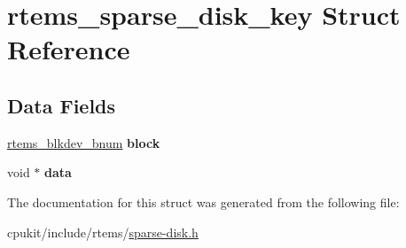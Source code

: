 \hypertarget{structrtems__sparse__disk__key}{}\section{rtems\+\_\+sparse\+\_\+disk\+\_\+key Struct Reference}
\label{structrtems__sparse__disk__key}
\subsection*{Data Fields}
\begin{DoxyCompactItemize}
\item 
\mbox{\label{structrtems__sparse__disk__key_a52bbfe32bc9ae068a461835745270183}} 
\mbox{\hyperlink{group__rtems__disk_ga5fbcfd40b657bff6c54d9e393fab3274}{rtems\+\_\+blkdev\+\_\+bnum}} {\bfseries block}
\item 
\mbox{\label{structrtems__sparse__disk__key_a7084dc44764396310883bb5858154a2d}} 
void $\ast$ {\bfseries data}
\end{DoxyCompactItemize}


The documentation for this struct was generated from the following file\+:\begin{DoxyCompactItemize}
\item 
cpukit/include/rtems/\mbox{\hyperlink{sparse-disk_8h}{sparse-\/disk.\+h}}\end{DoxyCompactItemize}
